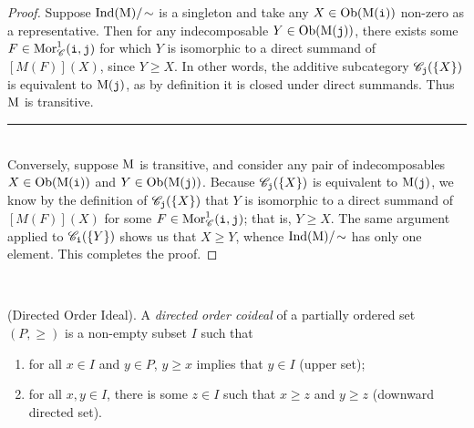 \noindent\begin{proof} Suppose $\textnormal{Ind}(\textnormal{M})/\!\sim$ is a singleton and take any $X \in \textnormal{Ob}(\textnormal{M}(\textnormal{\texttt{i}}))$ non-zero as a representative. Then for any indecomposable $Y \in \textnormal{Ob}(\textnormal{M}(\textnormal{\texttt{j}}))$, there exists some $F \in \textnormal{Mor}_\mathscr{C}^1(\textnormal{\texttt{i}}, \textnormal{\texttt{j}})$ for which $Y$ is isomorphic to a direct summand of $[M(F)](X)$, since $Y \geq X$. In other words, the additive subcategory $\mathscr{C}_{\textnormal{\texttt{j}}}(\{X\})$ is equivalent to $\textnormal{M}(\textnormal{\texttt{j}})$, as by definition it is closed under direct summands. Thus $\textnormal{M}$ is transitive.\\[-1.5\baselineskip]
\begin{center}
\rule{0.5\linewidth}{1pt}
\end{center}
\noindent\\[-\baselineskip]
\noindent Conversely, suppose $\textnormal{M}$ is transitive, and consider any pair of indecomposables $X \in \textnormal{Ob}(\textnormal{M}(\textnormal{\texttt{i}}))$ and $Y \in \textnormal{Ob}(\textnormal{M}(\textnormal{\texttt{j}}))$. Because $\mathscr{C}_{\textnormal{\texttt{j}}}(\{X\})$ is equivalent to $\textnormal{M}(\textnormal{\texttt{j}})$, we know by the definition of $\mathscr{C}_{\textnormal{\texttt{j}}}(\{X\})$ that $Y$ is isomorphic to a direct summand of $[M(F)](X)$ for some $F \in \textnormal{Mor}_\mathscr{C}^1(\textnormal{\texttt{i}}, \textnormal{\texttt{j}})$; that is, $Y \geq X$. The same argument applied to $\mathscr{C}_{\textnormal{\texttt{i}}}(\{Y\})$ shows us that $X \geq Y$, whence $\textnormal{Ind}(\textnormal{M})/\!\sim$ has only one element. This completes the proof.
\end{proof}\\

\noindent\begin{definition}\textnormal{(Directed Order Ideal).} A {\em directed order coideal} of a partially ordered set $(P, \geq)$ is a non-empty subset $I$ such that
\begin{enumerate}[label=$\bullet$, leftmargin=4\parindent]
\item for all $x \in I$ and $y \in P$, $y \geq x$ implies that $y \in I$ (upper set);
\item for all $x, y \in I$, there is some $z \in I$ such that $x \geq z$ and $y \geq z$ (downward directed set).\\
\end{enumerate}
\end{definition}

